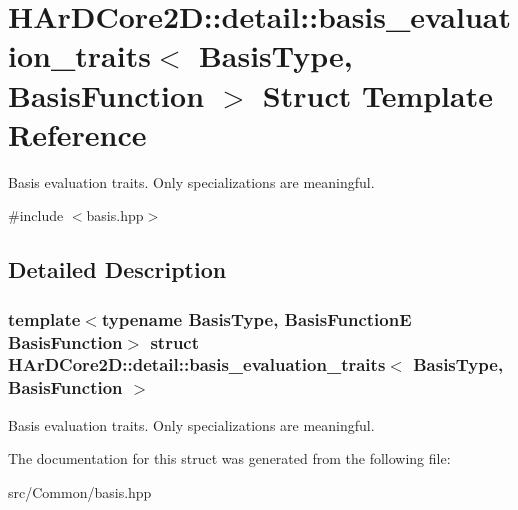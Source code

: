 \hypertarget{structHArDCore2D_1_1detail_1_1basis__evaluation__traits}{}\section{H\+Ar\+D\+Core2D\+:\+:detail\+:\+:basis\+\_\+evaluation\+\_\+traits$<$ Basis\+Type, Basis\+Function $>$ Struct Template Reference}
\label{structHArDCore2D_1_1detail_1_1basis__evaluation__traits}


Basis evaluation traits. Only specializations are meaningful.  




{\ttfamily \#include $<$basis.\+hpp$>$}



\subsection{Detailed Description}
\subsubsection*{template$<$typename Basis\+Type, Basis\+FunctionE Basis\+Function$>$\newline
struct H\+Ar\+D\+Core2\+D\+::detail\+::basis\+\_\+evaluation\+\_\+traits$<$ Basis\+Type, Basis\+Function $>$}

Basis evaluation traits. Only specializations are meaningful. 

The documentation for this struct was generated from the following file\+:\begin{DoxyCompactItemize}
\item 
src/\+Common/basis.\+hpp\end{DoxyCompactItemize}
